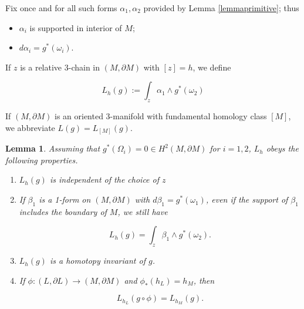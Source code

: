 \documentclass{amsart}
\newtheorem*{theorem 1}{Theorem 1}
\newtheorem*{theorem 2}{Theorem 2}
\newtheorem*{theorem 3}{Theorem 3}
\newtheorem{lemma}{Lemma}[section]
\numberwithin{equation}{section}
\begin{document}
\noindent Fix once and for all such forms $\alpha_1,\alpha_2$ provided by
Lemma \ref{lemmaprimitive}; thus
\begin{itemize}
\item $\alpha_i$ is supported in interior of $M$;
\item $d \alpha_i = g^*(\omega_i)$.
\end{itemize}

If $z$ is a relative 3-chain in $(M, \partial M)$ with $[z] = h$,  we define

\begin{equation} \label{defL}
L_h(g) := \int_z \alpha_1 \wedge g^*(\omega_2)
\end{equation}

If $(M,  \partial M)$ is an oriented 3-manifold with fundamental homology class $[M]$, we abbreviate $L(g) = L_{[M]}(g)$.  

\begin{lemma} \label{lemmalink} Assuming that $g^*(\Omega_i) = 0 \in H^2(M, \partial M)$ for $i = 1, 2$,  $L_h$ obeys the following properties.

\begin{enumerate}


\item $L_h(g)$ is independent of the choice of $z$

\item If $\beta_1$ is a 1-form on $(M, \partial M)$ with $d \beta_1 = g^*(\omega_1)$,  even if the support of $\beta_1$ includes the boundary of $M$,  we still have

$$ L_h(g) = \int_z \beta_1 \wedge g^*(\omega_2). $$

\item $L_h(g)$ is a homotopy invariant of $g$. 

\item If $\phi: (L, \partial L) \rightarrow (M, \partial M)$ and $\phi_*(h_L) = h_M$,  then

$$ L_{h_L}(g \circ \phi) = L_{h_M} (g).  $$

\end{enumerate}

\end{lemma}
\end{document}
